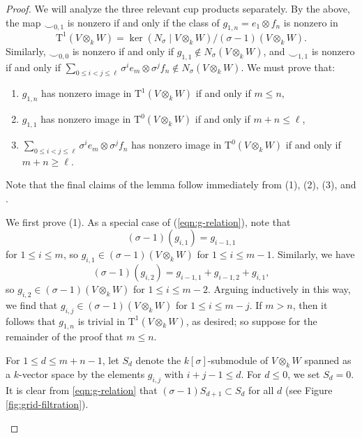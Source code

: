 \documentclass[reqno]{amsart}
\numberwithin{equation}{subsection}
\newcommand{\rT}{\ensuremath{\mathrm{T}}\xspace}
\theoremstyle{remark}
\numberwithin{equation}{subsection}
\numberwithin{figure}{subsection}
\begin{document}
\begin{proof}
We will analyze the three relevant cup products separately. By the above, the map $\smile_{0,1}$ is nonzero if and only if the class of $g_{1,n}=e_1\otimes f_n$ is nonzero in
\[
\rT^1(V\otimes_k W)=\ker(N_\sigma\mid V\otimes_k W)/(\sigma-1)(V\otimes_k W).
\]
Similarly, $\smile_{0,0}$ is nonzero if and only if $g_{1,1}\notin N_\sigma(V\otimes_k W)$, and $\smile_{1,1}$ is nonzero if and only if $\sum_{0\leq i<j\leq \ell}\sigma^i e_m\otimes \sigma^j f_n \notin N_\sigma(V\otimes_k W)$. We must prove that:
\begin{enumerate}
    \item $g_{1,n}$ has nonzero image in $\rT^1(V \otimes_k W)$ if and only if $m \leq n$,
    \item $g_{1,1}$ has nonzero image in $\rT^0(V \otimes_k W)$ if and only if $m + n \leq \ell$,
    \item $\sum_{0 \leq i < j \leq \ell} \sigma^ie_m \otimes \sigma^j f_n$ has nonzero image in $\rT^0(V \otimes_k W)$ if and only if $m + n \geq \ell$.
\end{enumerate}
Note that the final claims of the lemma follow immediately from (1), (2), (3), and \cite[Lemma~3.1.3]{Cot26b}.

We first prove (1). As a special case of (\ref{eqn:g-relation}), note that
\[
(\sigma - 1)(g_{i, 1}) = g_{i-1,1}
\]
for $1 \leq i \leq m$, so $g_{i,1} \in (\sigma-1)(V \otimes_k W)$ for $1 \leq i \leq m-1$. Similarly, we have
\[
(\sigma - 1)(g_{i,2}) = g_{i-1,1} + g_{i-1,2} + g_{i,1},
\]
so $g_{i,2} \in (\sigma - 1)(V \otimes_k W)$ for $1 \leq i \leq m-2$. Arguing inductively in this way, we find that $g_{i,j} \in (\sigma - 1)(V \otimes_k W)$ for $1 \leq i \leq m-j$. If $m > n$, then it follows that $g_{1,n}$ is trivial in $\rT^1(V \otimes_k W)$, as desired; so suppose for the remainder of the proof that $m \leq n$.

For $1 \leq d \leq m+n-1$, let $S_d$ denote the $k[\sigma]$-submodule of $V \otimes_k W$ spanned as a $k$-vector space by the elements $g_{i,j}$ with $i+j-1 \leq d$. For $d \leq 0$, we set $S_d =0$. It is clear from \eqref{eqn:g-relation} that $(\sigma-1)S_{d+1} \subset S_d$ for all $d$ (see Figure \ref{fig:grid-filtration}).


\begin{figure}[H]
\centering
{}
\end{figure}
\end{proof}
\end{document}
